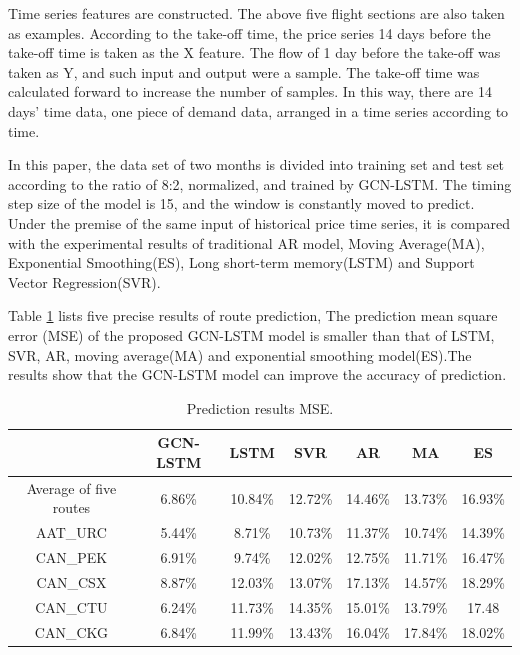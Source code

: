 \documentclass[journal,article,submit,moreauthors,pdftex]{Definitions/mdpi}
\begin{document}
\par Time series features are constructed. The above five flight sections are also taken as examples. According to the take-off time, the price series 14 days before the take-off time is taken as the X feature. The flow of 1 day before the take-off was taken as Y, and such input and output were a sample. The take-off time was calculated forward to increase the number of samples. In this way, there are 14 days' time data, one piece of demand data, arranged in a time series according to time.
\par In this paper, the data set of two months is divided into training set and test set according to the ratio of 8:2, normalized, and trained by GCN-LSTM. The timing step size of the model is 15, and the window is constantly moved to predict. Under the premise of the same input of historical price time series, it is compared with the experimental results of traditional AR model, Moving Average(MA), Exponential Smoothing(ES), Long short-term memory(LSTM) and Support Vector Regression(SVR).
\par Table \ref{table:2} lists five precise results of route prediction, The prediction mean square error (MSE) of the proposed GCN-LSTM model is smaller than that of LSTM, SVR, AR, moving average(MA) and exponential smoothing model(ES).The results show that the GCN-LSTM model can improve the accuracy of prediction.
\begin{table}[htbp]
    \centering
	\caption{Prediction results MSE.}
	\begin{tabular}{ccccccc}
		\toprule
		& GCN-LSTM	& LSTM  &  SVR  &  AR  &  MA  & ES\\
		\midrule
		Average of five routes	& 6.86\% & 10.84\%  &  12.72\% & 14.46\% & 13.73\%  &  16.93\%   \\
        AAT\_URC     & 5.44\% & 8.71\% & 10.73\% & 11.37\% & 10.74\% & 14.39\% \\
		CAN\_PEK		& 6.91\% & 9.74\% & 12.02\% & 12.75\% & 11.71\% & 16.47\% \\
        CAN\_CSX     & 8.87\% & 12.03\% & 13.07\% & 17.13\% & 14.57\% & 18.29\% \\
        CAN\_CTU     & 6.24\% & 11.73\% & 14.35\% & 15.01\% & 13.79\% & 17.48\\
        CAN\_CKG     & 6.84\% & 11.99\% & 13.43\% & 16.04\% & 17.84\% & 18.02\%\\
		\bottomrule
    \end{tabular}
    \label{table:2}
\end{table}
\end{document}
